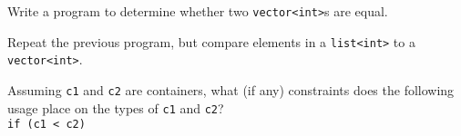 %
%
\begin{question}
Write a program to determine whether two \verb|vector<int>|s are equal.
\end{question}

\begin{question}
Repeat the previous program, but compare elements in a
\verb|list<int>| to a \verb|vector<int>|.
\end{question}

\begin{question}
Assuming \verb|c1| and \verb|c2| are containers, what (if any)
constraints does the following usage place on the types of \verb|c1| and \verb|c2|?\\
\verb|if (c1 < c2)|
\end{question}
